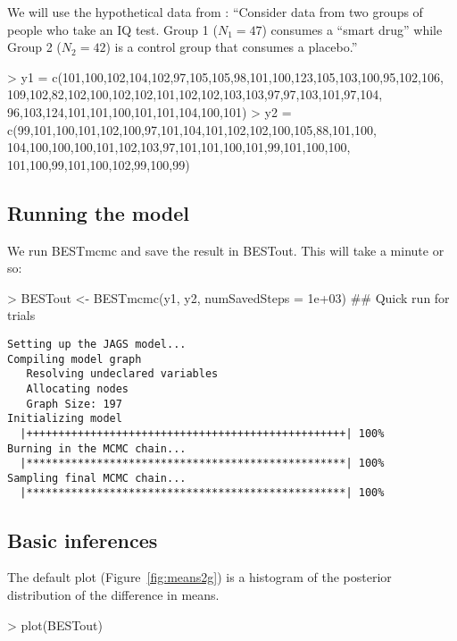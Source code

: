 \documentclass[a4paper]{article}
\begin{document}
We will use the hypothetical data from \citet{kruschke2012BEST}: ``Consider data from two groups of people who take an IQ test. Group 1 ($N_1 = 47$) consumes a ``smart drug'' while Group 2 ($N_2 = 42$) is a control group that consumes a placebo.''

\begin{Schunk}
\begin{Sinput}
> y1 = c(101,100,102,104,102,97,105,105,98,101,100,123,105,103,100,95,102,106,
         109,102,82,102,100,102,102,101,102,102,103,103,97,97,103,101,97,104,
         96,103,124,101,101,100,101,101,104,100,101)
> y2 = c(99,101,100,101,102,100,97,101,104,101,102,102,100,105,88,101,100,
         104,100,100,100,101,102,103,97,101,101,100,101,99,101,100,100,
         101,100,99,101,100,102,99,100,99)
\end{Sinput}
\end{Schunk}



\subsection{Running the model}
\label{subsec:run2g}

We run BESTmcmc and save the result in BESTout. This will take a minute or so:
\begin{Schunk}
\begin{Sinput}
> BESTout <- BESTmcmc(y1, y2, numSavedSteps = 1e+03)  ## Quick run for trials
\end{Sinput}
\end{Schunk}
\begin{verbatim}
Setting up the JAGS model...
Compiling model graph
   Resolving undeclared variables
   Allocating nodes
   Graph Size: 197
Initializing model
  |++++++++++++++++++++++++++++++++++++++++++++++++++| 100%
Burning in the MCMC chain...
  |**************************************************| 100%
Sampling final MCMC chain...
  |**************************************************| 100%
\end{verbatim}




\subsection{Basic inferences}
\label{subsec:infer2g}

The default plot (Figure~\ref{fig:means2g}) is a histogram of the posterior distribution of the difference in means. 
\begin{Schunk}
\begin{Sinput}
> plot(BESTout)
\end{Sinput}
\end{Schunk}
\end{document}
